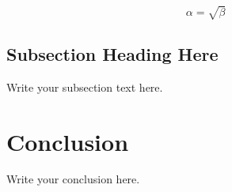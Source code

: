 \documentclass{article}
\begin{document}
\begin{equation}
    \label{simple_equation}
    \alpha = \sqrt{ \beta }
\end{equation}

\subsection{Subsection Heading Here}
Write your subsection text here.


\section{Conclusion}
Write your conclusion here.
\end{document}
